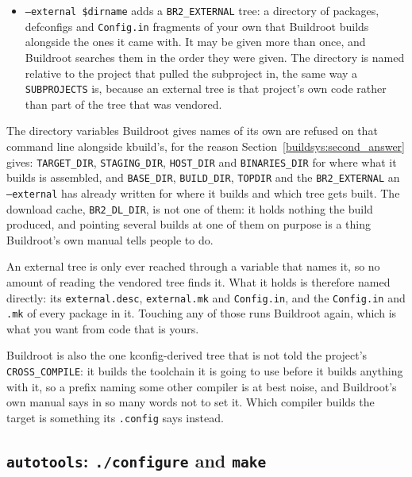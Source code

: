 \documentclass{article}
\begin{document}
\begin{itemize}
\item \texttt{--external \$dirname} adds a \texttt{BR2\_EXTERNAL}
  tree: a directory of packages, defconfigs and \texttt{Config.in}
  fragments of your own that Buildroot builds alongside the ones it
  came with.  It may be given more than once, and Buildroot searches
  them in the order they were given.  The directory is named relative
  to the project that pulled the subproject in, the same way a
  \texttt{SUBPROJECTS} is, because an external tree is that project's
  own code rather than part of the tree that was vendored.
\end{itemize}

The directory variables Buildroot gives names of its own are refused
on that command line alongside kbuild's, for the reason
Section~\ref{buildsys:second_answer} gives: \texttt{TARGET\_DIR},
\texttt{STAGING\_DIR}, \texttt{HOST\_DIR} and
\texttt{BINARIES\_DIR} for where what it builds is assembled, and
\texttt{BASE\_DIR}, \texttt{BUILD\_DIR}, \texttt{TOPDIR} and the
\texttt{BR2\_EXTERNAL} an \texttt{--external} has already written
for where it builds and which tree gets built.  The download cache,
\texttt{BR2\_DL\_DIR}, is not one of them: it holds nothing the
build produced, and pointing several builds at one of them on purpose
is a thing Buildroot's own manual tells people to do.

An external tree is only ever reached through a variable that names
it, so no amount of reading the vendored tree finds it.  What it holds
is therefore named directly: its \texttt{external.desc},
\texttt{external.mk} and \texttt{Config.in}, and the
\texttt{Config.in} and \texttt{.mk} of every package in it.  Touching
any of those runs Buildroot again, which is what you want from code
that is yours.

Buildroot is also the one kconfig-derived tree that is not told the
project's \texttt{CROSS\_COMPILE}: it builds the toolchain it is going
to use before it builds anything with it, so a prefix naming some
other compiler is at best noise, and Buildroot's own manual says in so
many words not to set it.  Which compiler builds the target is
something its \texttt{.config} says instead.

\subsection{\texttt{autotools}: \texttt{./configure} and \texttt{make}
\label{buildsys:autotools}}
\end{document}
